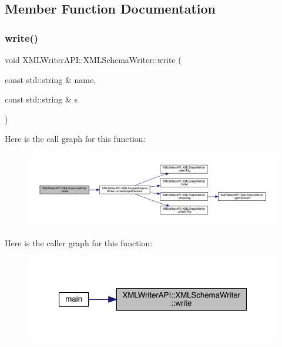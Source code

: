 \subsection{Member Function Documentation}
\mbox{\label{classXMLWriterAPI_1_1XMLSchemaWriter_a1922edfcbb9d52c70949fd8c8dd97569}} 
\subsubsection{\texorpdfstring{write()}{write()}\hspace{0.1cm}{\footnotesize\ttfamily [1/10]}}
{\footnotesize\ttfamily void X\+M\+L\+Writer\+A\+P\+I\+::\+X\+M\+L\+Schema\+Writer\+::write (\begin{DoxyParamCaption}\item[{const std\+::string \&}]{name,  }\item[{const std\+::string \&}]{s }\end{DoxyParamCaption})\hspace{0.3cm}{\ttfamily [inline]}}

Here is the call graph for this function\+:
\nopagebreak
\begin{figure}[H]
\begin{center}
\leavevmode
\includegraphics[width=350pt]{db/d34/classXMLWriterAPI_1_1XMLSchemaWriter_a1922edfcbb9d52c70949fd8c8dd97569_cgraph}
\end{center}
\end{figure}
Here is the caller graph for this function\+:\nopagebreak
\begin{figure}[H]
\begin{center}
\leavevmode
\includegraphics[width=321pt]{db/d34/classXMLWriterAPI_1_1XMLSchemaWriter_a1922edfcbb9d52c70949fd8c8dd97569_icgraph}
\end{center}
\end{figure}
\mbox{\label{classXMLWriterAPI_1_1XMLSchemaWriter_a1922edfcbb9d52c70949fd8c8dd97569}} 
